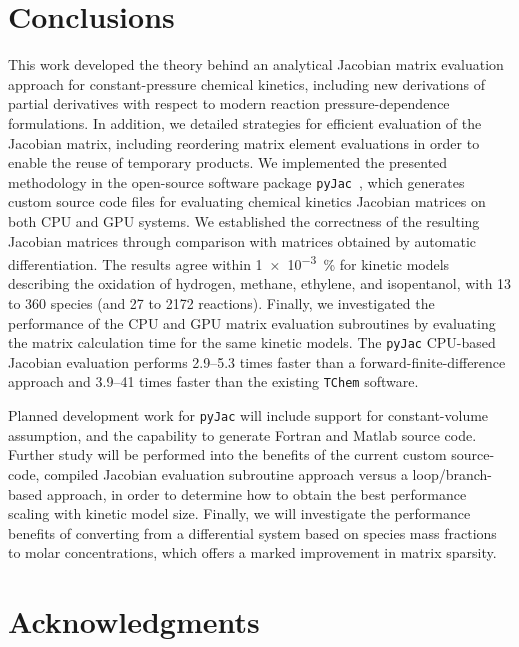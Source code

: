 \documentclass[preprint,12pt]{elsarticle}
\begin{document}
{\section{Conclusions}
\label{S:conclusions}

This work developed the theory behind an analytical Jacobian matrix evaluation approach for constant-pressure chemical kinetics, including new derivations of partial derivatives with respect to modern reaction pressure-dependence formulations.
In addition, we detailed strategies for efficient evaluation of the Jacobian matrix, including reordering matrix element evaluations in order to enable the reuse of temporary products.
We implemented the presented methodology in the open-source software package \texttt{pyJac}~\cite{Niemeyer:2015im}, which generates custom source code files for evaluating chemical kinetics Jacobian matrices on both CPU and GPU systems.
We established the correctness of the resulting Jacobian matrices through comparison with matrices obtained by automatic differentiation.
The results agree within \SI{1e-3}{\percent} for kinetic models describing the oxidation of hydrogen, methane, ethylene, and isopentanol, with 13 to 360 species (and 27 to 2172 reactions).
Finally, we investigated the performance of the CPU and GPU matrix evaluation subroutines by evaluating the matrix calculation time for the same kinetic models.
The \texttt{pyJac} CPU-based Jacobian evaluation performs \numrange{2.9}{5.3} times faster than a forward-finite-difference approach and \numrange{3.9}{41} times faster than the existing \texttt{TChem} software.

Planned development work for \texttt{pyJac} will include support for constant-volume assumption, and the capability to generate Fortran and Matlab source code.
Further study will be performed into the benefits of the current custom source-code, compiled Jacobian evaluation subroutine approach versus a loop\slash branch-based approach, in order to determine how to obtain the best performance scaling with kinetic model size.
Finally, we will investigate the performance benefits of converting from a differential system based on species mass fractions to molar concentrations, which offers a marked improvement in matrix sparsity.

\section*{Acknowledgments}

}
\end{document}
